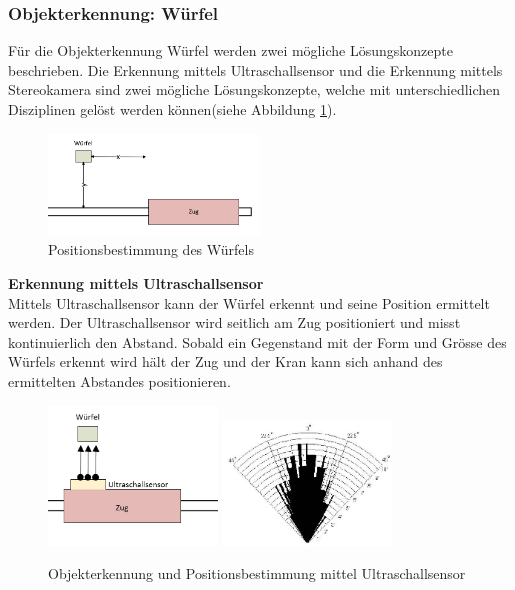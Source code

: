 \documentclass[../../../main.tex]{subfiles}
\begin{document}
    \subsubsection{Objekterkennung: Würfel}
    Für die Objekterkennung Würfel werden zwei mögliche Lösungskonzepte beschrieben. Die Erkennung mittels Ultraschallsensor und die Erkennung mittels Stereokamera sind zwei mögliche Lösungskonzepte, welche mit unterschiedlichen Disziplinen gelöst werden können(siehe Abbildung \ref{fig:wurfelerkennung}).
    \begin{figure}[H] %
        \centering
        \includegraphics[width=0.5\textwidth]{wurfelerkennung.png}
        \caption{Positionsbestimmung des Würfels}
        \label{fig:wurfelerkennung}
    \end{figure}

    \textbf{Erkennung mittels Ultraschallsensor}\\
    Mittels Ultraschallsensor kann der Würfel erkennt und seine Position ermittelt werden. Der Ultraschallsensor
    wird seitlich am Zug positioniert und misst kontinuierlich den Abstand. Sobald ein Gegenstand mit der Form und
    Grösse des Würfels erkennt wird hält der Zug und der Kran kann sich anhand des ermittelten Abstandes 
    positionieren.
    \begin{figure}[H] %
        \centering
        \includegraphics[width=0.4\textwidth]{Ultraschallsensor.png}
        \includegraphics[width=0.4\textwidth]{Ultraschallsensor_angle.png}
        \caption{Objekterkennung und Positionsbestimmung mittel Ultraschallsensor}
        \label{fig:wurfel_ultraschall}
    \end{figure}
\end{document}
